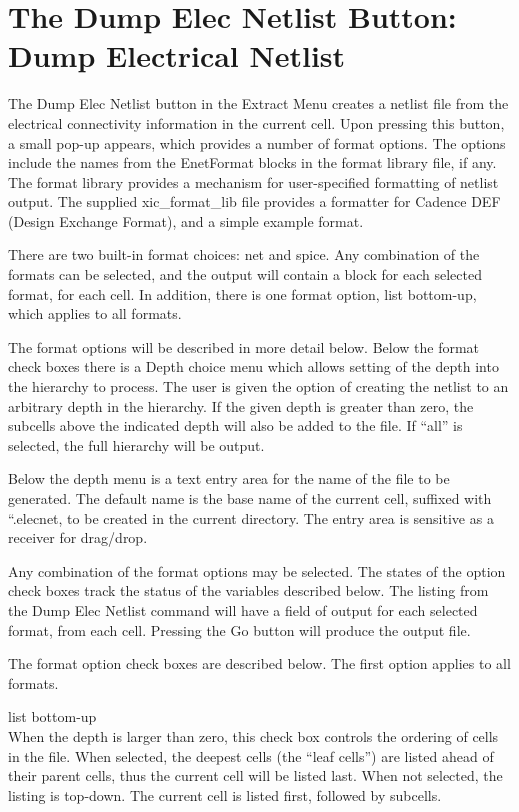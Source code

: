 \section{The {\cb Dump Elec Netlist} Button: Dump Electrical Netlist}
The {\cb Dump Elec Netlist} button in the {\cb Extract Menu} creates a
netlist file from the electrical connectivity information in the
current cell.  Upon pressing this button, a small pop-up appears,
which provides a number of format options.  The options include the
names from the {\vt EnetFormat} blocks in the format library file, if
any.  The format library provides a mechanism for user-specified
formatting of netlist output.  The supplied {\vt xic\_format\_lib}
file provides a formatter for Cadence DEF (Design Exchange Format),
and a simple example format.

There are two built-in format choices:  {\cb net} and {\cb spice}. 
Any combination of the formats can be selected, and the output will
contain a block for each selected format, for each cell.  In addition,
there is one format option, {\cb list bottom-up}, which applies to all
formats.

The format options will be described in more detail below.  Below the
format check boxes there is a {\cb Depth} choice menu which allows
setting of the depth into the hierarchy to process.  The user is given
the option of creating the netlist to an arbitrary depth in the
hierarchy.  If the given depth is greater than zero, the subcells
above the indicated depth will also be added to the file.  If ``all''
is selected, the full hierarchy will be output.

Below the depth menu is a text entry area for the name of the file to
be generated.  The default name is the base name of the current cell,
suffixed with ``{\vt .elecnet}, to be created in the current
directory.  The entry area is sensitive as a receiver for drag/drop.

Any combination of the format options may be selected.  The states of
the option check boxes track the status of the variables described
below.  The listing from the {\cb Dump Elec Netlist} command will have
a field of output for each selected format, from each cell.  Pressing
the {\cb Go} button will produce the output file.

The format option check boxes are described below.  The first option
applies to all formats.

\begin{description}
\item{\cb list bottom-up}\\
When the depth is larger than zero, this check box controls the
ordering of cells in the file.  When selected, the deepest cells (the
``leaf cells'') are listed ahead of their parent cells, thus the
current cell will be listed last.  When not selected, the listing is
top-down.  The current cell is listed first, followed by subcells.
\end{description}


